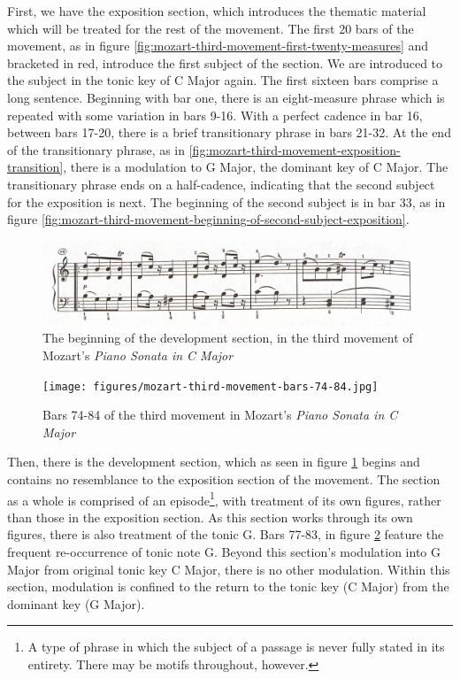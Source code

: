 First, we have the exposition section, which introduces the thematic material which will be treated for the rest of the movement. The first 20 bars of the movement, as in figure \ref{fig:mozart-third-movement-first-twenty-measures}\autocite{Henle_1977} and bracketed in red, introduce the first subject of the section. We are introduced to the subject in the tonic key of C Major again. The first sixteen bars comprise a long sentence. Beginning with bar one, there is an eight-measure phrase which is repeated with some variation in bars 9-16. With a perfect cadence in bar 16, between bars 17-20, there is a brief transitionary phrase in bars 21-32. At the end of the transitionary phrase, as in \ref{fig:mozart-third-movement-exposition-transition}\autocite{Henle_1977}, there is a modulation to G Major, the dominant key of C Major. The transitionary phrase ends on a half-cadence, indicating that the second subject for the exposition is next. The beginning of the second subject is in bar 33, as in figure \ref{fig:mozart-third-movement-beginning-of-second-subject-exposition}\autocite{Henle_1977}. 

\begin{figure}
	\centering
	\includegraphics[width=\textwidth]{figures/mozart-third-movement-development-section-first-six-bars.jpg}
	\caption[The development section of Movement III, in Mozart's \textit{Piano Sonata in C Major}]{The beginning of the development section, in the third movement of Mozart's \textit{Piano Sonata in C Major}}
	\label{fig:mozart-third-movement-development-section-first-six-bars}
\end{figure}

\begin{figure}
	\centering
	\texttt{[image: figures/mozart-third-movement-bars-74-84.jpg]}
	\caption{Bars 74-84 of the third movement in Mozart's \textit{Piano Sonata in C Major}}
	\label{fig:mozart-third-movement-bars-74-84}
\end{figure}

Then, there is the development section, which as seen in figure \ref{fig:mozart-third-movement-development-section-first-six-bars}\autocite{Henle_1977} begins and contains no resemblance to the exposition section of the movement. The section as a whole is comprised of an episode\footnote{A type of phrase in which the subject of a passage is never fully stated in its entirety. There may be motifs throughout, however.}, with treatment of its own figures, rather than those in the exposition section. As this section works through its own figures, there is also treatment of the tonic G. Bars 77-83, in figure \ref{fig:mozart-third-movement-bars-74-84}\autocite{Henle_1977} feature the frequent re-occurrence of tonic note G. Beyond this section's modulation into G Major from original tonic key C Major, there is no other modulation. Within this section, modulation is confined to the return to the tonic key (C Major) from the dominant key (G Major).


